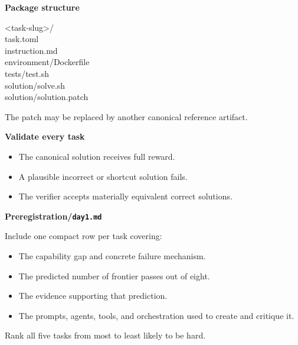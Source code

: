 \documentclass[10pt,letterpaper]{article}
\newcommand{\subhead}[1]{{\fontsize{10.5}{13}\selectfont\bfseries #1}\par\vspace{5pt}}
\begin{document}
\begin{minipage}[t]{0.51\linewidth}
\vspace{0pt}\raggedright
\subhead{Package structure}
{\fontsize{9}{13}\selectfont\ttfamily
<task-slug>/\\
\hspace*{10pt}task.toml\\
\hspace*{10pt}instruction.md\\
\hspace*{10pt}environment/Dockerfile\\
\hspace*{10pt}tests/test.sh\\
\hspace*{10pt}solution/solve.sh\\
\hspace*{10pt}solution/solution.patch}\par
\vspace{5pt}
{\fontsize{9}{12}\selectfont\color{secondary}The patch may be replaced by another canonical reference artifact.}
\end{minipage}\hfill
\begin{minipage}[t]{0.45\linewidth}
\vspace{0pt}\raggedright
\subhead{Validate every task}
\begin{itemize}[topsep=0pt,itemsep=7pt]
\item The canonical solution receives full reward.
\item A plausible incorrect or shortcut solution fails.
\item The verifier accepts materially equivalent correct solutions.
\end{itemize}
\end{minipage}\par
\vspace{16pt}

\subhead{Preregistration\enspace /\enspace \texttt{day1.md}}
Include one compact row per task covering:
\begin{itemize}[itemsep=4pt]
\item The capability gap and concrete failure mechanism.
\item The predicted number of frontier passes out of eight.
\item The evidence supporting that prediction.
\item The prompts, agents, tools, and orchestration used to create and critique it.
\end{itemize}
\vspace{5pt}
Rank all five tasks from most to least likely to be hard.
\end{document}
